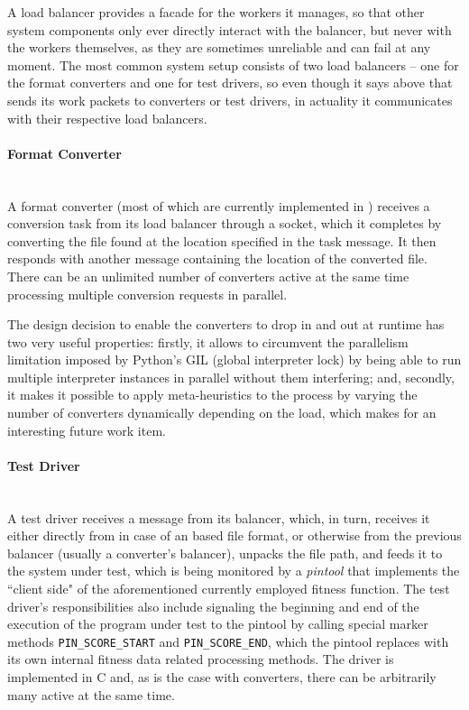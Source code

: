   A load balancer provides a facade for the workers it manages, so that other system components only ever
  directly interact with the balancer, but never with the workers themselves, as they are sometimes unreliable
  and can fail at any moment. The most common system setup consists of two load balancers -- one for the format
  converters and one for test drivers, so even though it says above that \xmlmate sends its work packets to
  converters or test drivers, in actuality it communicates with their respective load balancers. 
  \paragraph{Format Converter} ~\\
  A format converter (most of which are currently implemented in \python) receives a conversion task from
  its load balancer through a \zmq socket, which it completes by converting the file found at the location
  specified in the task message. It then responds with another message containing the location of the converted
  file. There can be an unlimited number of converters active at the same time processing multiple
  conversion requests in parallel. 
  
  The design decision to enable the converters to drop in and out at
  runtime has two very useful properties: firstly, it allows to circumvent the parallelism limitation
  imposed by Python's GIL (global interpreter lock) by being able to run multiple interpreter
  instances in parallel without them interfering; and, secondly, it makes it possible to apply meta-heuristics
  to the process by varying the number of converters dynamically depending on the load, which makes for an
  interesting future work item.
  \paragraph{Test Driver} ~\\
  A test driver receives a message from its balancer, which, in turn, receives it either directly from
  \xmlmate in case of an \xml based file format, or otherwise from the previous balancer (usually a
  converter's balancer), unpacks the file path, and feeds it to the system under test, which is being monitored
  by a \emph{pintool} that implements the ``client side" of the aforementioned currently employed fitness
  function. The test driver's responsibilities also include signaling the beginning and end of the execution of
  the program under test to the pintool by calling special marker methods \texttt{PIN\_SCORE\_START}
  and \texttt{PIN\_SCORE\_END}, which the pintool replaces with its own internal fitness data related
  processing methods. The driver is implemented in C and, as is the case with converters, there can
  be arbitrarily many active at the same time.

